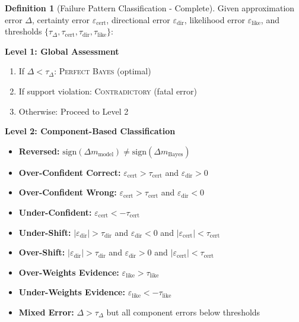 \documentclass{article}
\theoremstyle{definition}
\newtheorem{definition}{Definition}
\begin{document}
\begin{definition}[Failure Pattern Classification - Complete]
Given approximation error $\Delta$, certainty error $\varepsilon_{\text{cert}}$, directional error $\varepsilon_{\text{dir}}$, likelihood error $\varepsilon_{\text{like}}$, and thresholds $\{\tau_{\Delta}, \tau_{\text{cert}}, \tau_{\text{dir}}, \tau_{\text{like}}\}$:

\textbf{Level 1: Global Assessment}
\begin{enumerate}
    \item If $\Delta < \tau_{\Delta}$: \textsc{Perfect Bayes} (optimal)
    \item If support violation: \textsc{Contradictory} (fatal error)
    \item Otherwise: Proceed to Level 2
\end{enumerate}

\textbf{Level 2: Component-Based Classification}

\begin{itemize}
    \item \textbf{Reversed:} $\text{sign}(\Delta m_{\text{model}}) \neq \text{sign}(\Delta m_{\text{Bayes}})$

    \item \textbf{Over-Confident Correct:} $\varepsilon_{\text{cert}} > \tau_{\text{cert}}$ and $\varepsilon_{\text{dir}} > 0$

    \item \textbf{Over-Confident Wrong:} $\varepsilon_{\text{cert}} > \tau_{\text{cert}}$ and $\varepsilon_{\text{dir}} < 0$

    \item \textbf{Under-Confident:} $\varepsilon_{\text{cert}} < -\tau_{\text{cert}}$

    \item \textbf{Under-Shift:} $|\varepsilon_{\text{dir}}| > \tau_{\text{dir}}$ and $\varepsilon_{\text{dir}} < 0$ and $|\varepsilon_{\text{cert}}| < \tau_{\text{cert}}$

    \item \textbf{Over-Shift:} $|\varepsilon_{\text{dir}}| > \tau_{\text{dir}}$ and $\varepsilon_{\text{dir}} > 0$ and $|\varepsilon_{\text{cert}}| < \tau_{\text{cert}}$

    \item \textbf{Over-Weights Evidence:} $\varepsilon_{\text{like}} > \tau_{\text{like}}$

    \item \textbf{Under-Weights Evidence:} $\varepsilon_{\text{like}} < -\tau_{\text{like}}$

    \item \textbf{Mixed Error:} $\Delta > \tau_{\Delta}$ but all component errors below thresholds
\end{itemize}
\end{definition}
\end{document}
